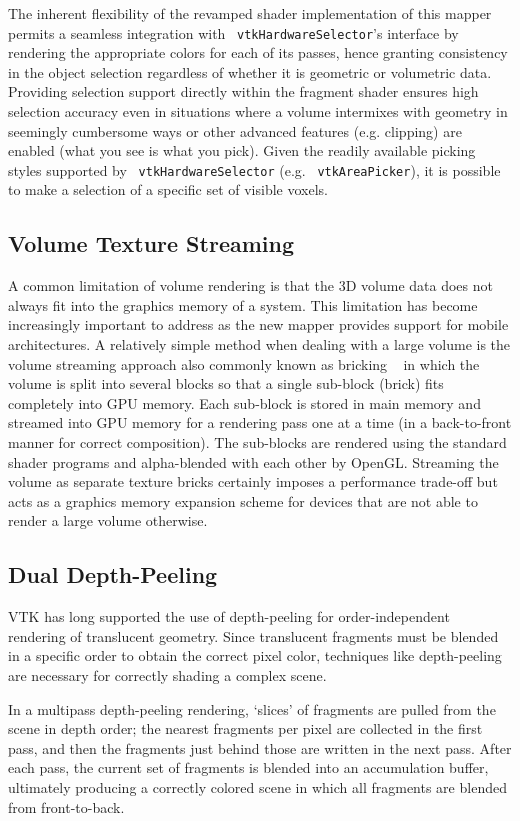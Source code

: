 The inherent flexibility of the revamped shader implementation of this mapper
permits a seamless integration with ~\texttt{vtkHardwareSelector}'s interface by
rendering the appropriate colors for each of its passes, hence granting
consistency in the object selection regardless of whether it is geometric or
volumetric data.  Providing selection support directly within the fragment
shader ensures high selection accuracy even in situations where a volume
intermixes with geometry in seemingly cumbersome ways or other advanced features
(e.g. clipping) are enabled (what you see is what you pick).  Given the readily
available picking styles supported by ~\texttt{vtkHardwareSelector} (e.g.
~\texttt{vtkAreaPicker}), it is possible to make a selection of a specific set
of visible voxels.

\subsection{Volume Texture Streaming} A common limitation of volume
rendering is that the 3D volume data does not always fit into the
graphics memory of a system. This limitation has become increasingly important to
address as the new mapper provides support for mobile architectures.  A
relatively simple method when dealing with a large volume is the volume
streaming approach also commonly known as bricking ~\citep{engel_real-time_2006}
in which the volume is split into several blocks so that a single sub-block (brick)
fits completely into GPU memory.  Each sub-block is stored in main memory and streamed
into GPU memory for a rendering pass one at a time (in a back-to-front manner for correct
composition). The sub-blocks are rendered using the standard shader programs and
alpha-blended with each other by OpenGL. Streaming the volume as separate
texture bricks certainly imposes a performance trade-off but acts as a graphics
memory expansion scheme for devices that are not able to render a large volume otherwise.

\subsection{Dual Depth-Peeling} VTK has long supported the use of depth-peeling
for order-independent rendering of translucent geometry. Since translucent
fragments must be blended in a specific order to obtain the correct pixel color,
techniques like depth-peeling are necessary for correctly shading a complex
scene.

In a multipass depth-peeling rendering, `slices' of fragments are pulled from
the scene in depth order; the nearest fragments per pixel are collected in
the first pass, and then the fragments just behind those are written in the next
pass. After each pass, the current set of fragments is blended into an
accumulation buffer, ultimately producing a correctly colored scene in which all
fragments are blended from front-to-back.


